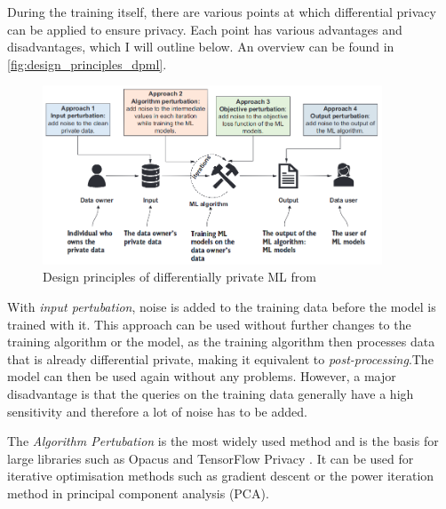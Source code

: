 During the training itself, there are various points at which differential privacy can be applied to ensure privacy. Each point has various advantages and disadvantages, which I will outline below. An overview can be found in \autoref{fig:design_principles_dpml}.

\begin{figure}[tb]
	\centering
	\includegraphics[width=0.9\textwidth]{Bilder/design_principles_dpml.png}
	\caption{Design principles of differentially private ML from \textcite{chang:2023}}
	\label{fig:design_principles_dpml}
\end{figure}

With \textit{input pertubation}, noise is added to the training data before the model is trained with it. This approach can be used without further changes to the training algorithm or the model, as the training algorithm then processes data that is already differential private, making it equivalent to \textit{post-processing}.The model can then be used again without any problems. However, a major disadvantage is that the queries on the training data generally have a high sensitivity and therefore a lot of noise has to be added.

The \textit{Algorithm Pertubation} is the most widely used method and is the basis for large libraries such as Opacus \cite{yousefpour:2021} and TensorFlow Privacy \cite{tfprivacy}. It can be used for iterative optimisation methods such as gradient descent or the power iteration method in principal component analysis (PCA).

